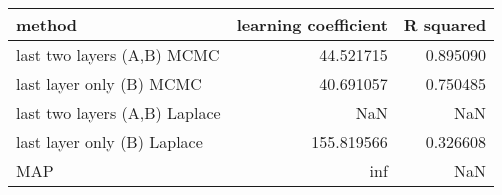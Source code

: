 \begin{tabular}{lrr}
\toprule
                        method &  learning coefficient &  R squared \\
\midrule
    last two layers (A,B) MCMC &             44.521715 &   0.895090 \\
      last layer only (B) MCMC &             40.691057 &   0.750485 \\
 last two layers (A,B) Laplace &                   NaN &        NaN \\
   last layer only (B) Laplace &            155.819566 &   0.326608 \\
                           MAP &                   inf &        NaN \\
\bottomrule
\end{tabular}
